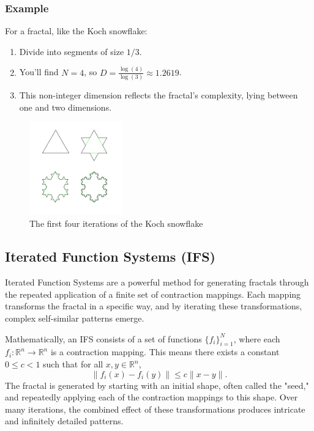 \documentclass[12pt]{article}
\begin{document}
\subsubsection{Example}
For a fractal, like the Koch snowflake:
	\begin{enumerate}
		\item Divide into segments of size \(1/3\).
		\item You’ll find \(N = 4\), so \(D = \frac{\log(4)}{\log(3)} \approx 1.2619\).
		\item This non-integer dimension reflects the fractal's complexity, lying between one and two dimensions.
	\end{enumerate}
\begin{figure}[H] \centering \includegraphics[width=0.36\textwidth]{assets/KochFlake.png} \caption{The first four iterations of the Koch snowflake} \label{fig:example} \end{figure}

\subsection{Iterated Function Systems (IFS)}
Iterated Function Systems are a powerful method for generating fractals through the repeated application of a finite set of contraction mappings. Each mapping transforms the fractal in a specific way, and by iterating these transformations, complex self-similar patterns emerge.

Mathematically, an IFS consists of a set of functions \( \{f_i\}_{i=1}^N \), where each \( f_i: \mathbb{R}^n \to \mathbb{R}^n \) is a contraction mapping. This means there exists a constant \( 0 \leq c < 1 \) such that for all \( x, y \in \mathbb{R}^n \),
\[
\| f_i(x) - f_i(y) \| \leq c \| x - y \|.
\]
The fractal is generated by starting with an initial shape, often called the "seed," and repeatedly applying each of the contraction mappings to this shape. Over many iterations, the combined effect of these transformations produces intricate and infinitely detailed patterns.
\end{document}
